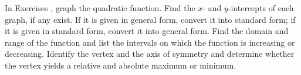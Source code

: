 {\noindent In Exercises}
{, graph the quadratic function.  Find the $x$- and $y$-intercepts of each graph, if any exist.  If it is given in general form, convert it into standard form; if it is given in standard form, convert it into general form.  Find the domain and range of the function and list the intervals on which the function is increasing or decreasing.  Identify the vertex and the axis of symmetry and determine whether the vertex yields a relative and absolute maximum or minimum.}

